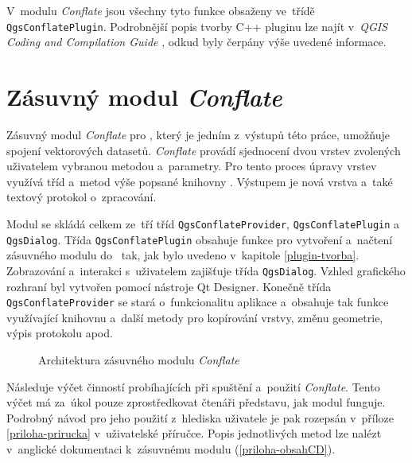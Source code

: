 V~modulu \textit{Conflate} jsou všechny tyto funkce obsaženy ve~třídě
\texttt{Qgs\-Con\-flate\-Plugin}. 
Podrobnější popis tvorby C++ pluginu lze najít v~\textit{QGIS Coding and 
Compilation Guide} \cite{qgisCCguide}, odkud byly čerpány výše uvedené 
informace.



\section{Zásuvný modul \textit{Conflate}}
\label{plugin-navrh}

Zásuvný modul \textit{Conflate} pro , který je jedním z~výstupů této
práce, umožňuje spojení vektorových datasetů. \textit{Conflate} provádí 
sjednocení dvou vrstev zvolených uživatelem vybranou metodou a~parametry. Pro 
tento proces úpravy vrstev využívá tříd a~metod výše popsané knihovny . 
Výstupem je nová vrstva a~také textový protokol o~zpracování.

Modul se skládá celkem ze~tří tříd \texttt{QgsConflateProvider}, 
\texttt{QgsConflatePlugin} a~ \texttt{QgsDialog}. Třída \texttt{QgsConflatePlugin} 
obsahuje funkce pro vytvoření a~načtení zásuvného modulu do~ tak, jak 
bylo uvedeno v~kapitole \ref{plugin-tvorba}. Zobrazování a~interakci s~uživatelem 
zajišťuje třída \texttt{QgsDialog}. Vzhled grafického rozhraní byl vytvořen 
pomocí nástroje Qt Designer. Konečně třída \texttt{QgsConflateProvider} 
se stará o~funkcionalitu aplikace a~obsahuje tak funkce využívající knihovnu 
 a~další metody pro kopírování vrstvy, změnu geometrie, výpis 
protokolu apod.

\vspace{0.5cm}
\label{schema}
  \begin{figure}[h]
    \centering
      
      \caption{Architektura zásuvného modulu \textit{Conflate}}
      \label{fig:schema}
  \end{figure} 

Následuje výčet činností probíhajících při spuštění a~použití \textit{Conflate}.
Tento výčet má za~úkol pouze zprostředkovat čtenáři představu, jak modul funguje.
Podrobný návod pro jeho použití z~hlediska uživatele je pak rozepsán v~příloze
\ref{priloha-prirucka} v~uživatelské příručce. Popis jednotlivých metod
lze nalézt v~anglické dokumentaci k~zásuvnému modulu (\ref{priloha-obsahCD}).

